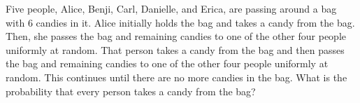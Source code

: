 Five people, Alice, Benji, Carl, Danielle, and Erica, are passing around a bag with 6 candies in it. Alice initially holds the bag and takes a candy from the bag. Then, she passes the bag and remaining candies to one of the other four people uniformly at random. That person takes a candy from the bag and then passes the bag and remaining candies to one of the other four people uniformly at random. This continues until there are no more candies in the bag. What is the probability that every person takes a candy from the bag?

